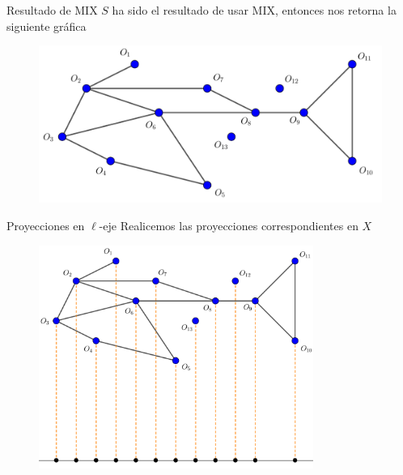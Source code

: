 \begin{frame}{Resultado de MIX}
  $S$ ha sido el resultado de usar MIX, entonces nos retorna la siguiente gráfica

  \begin{figure}  
    \centering
    \includegraphics[width=1\textwidth]{./Images/ED01.png}
  \end{figure}
\end{frame}

\begin{frame}{Proyecciones en $\ell$-eje}
  Realicemos las proyecciones correspondientes en $X$

  \begin{figure}  
    \centering
    \includegraphics[width=0.8\textwidth]{./Images/ED02.png}
  \end{figure}
\end{frame}

